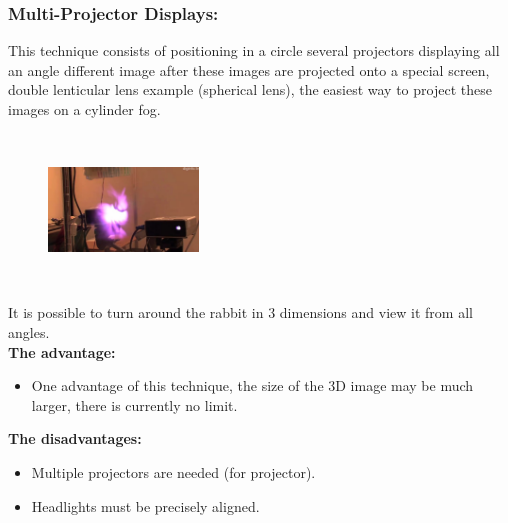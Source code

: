 \subsubsection{Multi-Projector Displays:}

This technique consists of positioning in a circle several projectors displaying all an angle different image after these images are projected onto a special screen, double lenticular lens example (spherical lens), the easiest way to project these images on a cylinder fog.

\begin{figure}[h!]
\begin{center}
\begin{minipage}{1\linewidth}
\centering\includegraphics[width=4cm,height=4cm]{image/lapin.jpg}
\caption{}
\end{minipage}
\end{center}
\end{figure}

It is possible to turn around the rabbit in 3 dimensions and view it from all angles.\\
\textbf{The advantage:} 
\begin{itemize}

\item One advantage of this technique, the size of the 3D image may be much larger, there is currently no limit.
\end{itemize}
\textbf{The disadvantages:}
\begin{itemize}

\item  Multiple projectors are needed (for projector).
\item Headlights must be precisely aligned.

\end{itemize}


